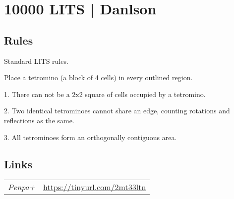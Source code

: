\section[10000 LITS | Danlson {[\emph{3D LITS}]}]{10000 LITS | {\normalfont Danlson}}
\label{sec:09-10000-lits-danlson}

\subsection*{Rules}
\begin{markdown}
Standard LITS rules.

Place a tetromino (a block of 4 cells) in every outlined region.

1. There can not be a 2x2 square of cells occupied by a tetromino.

2. Two identical tetrominoes cannot share an edge, counting rotations and reflections as the same.

3. All tetrominoes form an orthogonally contiguous area.
\end{markdown}
\subsection*{Links}
\begin{tabularx}{\textwidth}{l X}
\emph{Penpa+} & \url{https://tinyurl.com/2mt33ltn} \\
\end{tabularx}
\pagebreak
